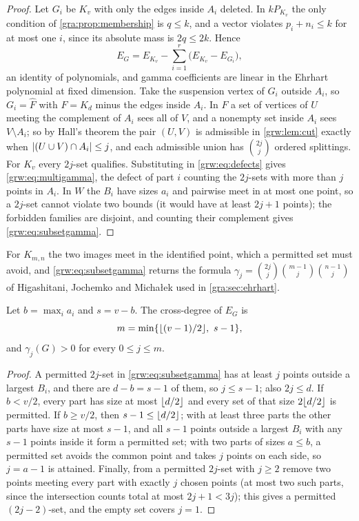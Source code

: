 \begin{proof}
Let $G_i$ be $K_v$ with only the edges inside $A_i$ deleted. In $kP_{K_v}$
the only condition of \cref{gra:prop:membership} is $q\le k$, and a vector
violates $p_i+n_i\le k$ for at most one $i$, since its absolute mass is
$2q\le2k$. Hence
\begin{equation}\label{grw:eq:defects}
 E_G=E_{K_v}-\sum_{i=1}^r\bigl(E_{K_v}-E_{G_i}\bigr),
\end{equation}
an identity of polynomials, and gamma coefficients are linear in the
Ehrhart polynomial at fixed dimension. Take the suspension vertex of $G_i$
outside $A_i$, so $G_i=\widehat F$ with $F=K_d$ minus the edges inside $A_i$.
In $F$ a set of vertices of $U$ meeting the complement of $A_i$ sees all of
$V$, and a nonempty set inside $A_i$ sees $V\setminus A_i$; so by Hall's
theorem the pair $(U,V)$ is admissible in \cref{grw:lem:cut} exactly when
$\lvert(U\cup V)\cap A_i\rvert\le j$, and each admissible union has $\binom{2j}j$
ordered splittings. For $K_v$ every $2j$-set qualifies. Substituting in
\eqref{grw:eq:defects} gives \eqref{grw:eq:multigamma}, the defect of part
$i$ counting the $2j$-sets with more than $j$ points in $A_i$. In $W$ the
$B_i$ have sizes $a_i$ and pairwise meet in at most one point, so a
$2j$-set cannot violate two bounds (it would have at least $2j+1$ points);
the forbidden families are disjoint, and counting their complement gives
\eqref{grw:eq:subsetgamma}.
\end{proof}

For $K_{m,n}$ the two images meet in the identified point, which a
permitted set must avoid, and \eqref{grw:eq:subsetgamma} returns the formula
$\gamma_j=\binom{2j}j\binom{m-1}j\binom{n-1}j$ of Higashitani, Jochemko and
Micha\l{}ek used in \cref{gra:sec:ehrhart}.

\begin{theorem}\label{grw:thm:crossdegree}
Let $b=\max_ia_i$ and $s=v-b$. The cross-degree of $E_G$ is
\[
 m=\min\{\floor{(v-1)/2},\ s-1\},
\]
and $\gamma_j(G)>0$ for every $0\le j\le m$.
\end{theorem}

\begin{proof}
A permitted $2j$-set in \eqref{grw:eq:subsetgamma} has at least $j$ points
outside a largest $B_i$, and there are $d-b=s-1$ of them, so $j\le s-1$; also
$2j\le d$. If $b<v/2$, every part has size at most $\lfloor d/2\rfloor$ and every
set of that size $2\lfloor d/2\rfloor$ is permitted. If $b\ge v/2$, then $s-1\le
\lfloor d/2\rfloor$; with at least three parts the other parts have size at most
$s-1$, and all $s-1$ points outside a largest $B_i$ with any $s-1$ points
inside it form a permitted set; with two parts of sizes $a\le b$, a
permitted set avoids the common point and takes $j$ points on each side, so
$j=a-1$ is attained. Finally, from a permitted $2j$-set with $j\ge2$ remove
two points meeting every part with exactly $j$ chosen points (at most two
such parts, since the intersection counts total at most $2j+1<3j$); this
gives a permitted $(2j-2)$-set, and the empty set covers $j=1$.
\end{proof}

